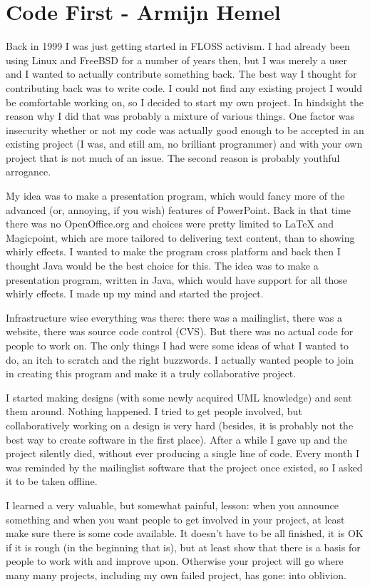 \chapter{Code First - Armijn Hemel}
Back in 1999 I was just getting started in FLOSS activism. I had already been using Linux and FreeBSD for a number of years then, but I was merely a user and I wanted to actually contribute something back. The best way I thought for contributing back was to write code. I could not find any existing project I would be comfortable working on, so I decided to start my own project. In hindsight the reason why I did that was probably a mixture of various things. One factor was insecurity whether or not my code was actually good enough to be accepted in an existing project (I was, and still am, no brilliant programmer) and with your own project that is not much of an issue. The second reason is probably youthful arrogance.

My idea was to make a presentation program, which would fancy more of the advanced (or, annoying, if you wish) features of PowerPoint. Back in that time there was no OpenOffice.org and choices were pretty limited to LaTeX and Magicpoint, which are more tailored to delivering text content, than to showing whirly effects. I wanted to make the program cross platform and back then I thought Java would be the best choice for this. The idea was to make a presentation program, written in Java, which would have support for all those whirly effects. I made up my mind and started the project.

Infrastructure wise everything was there: there was a mailinglist, there was a website, there was source code control (CVS). But there was no actual code for people to work on. The only things I had were some ideas of what I wanted to do, an itch to scratch and the right buzzwords. I actually wanted people to join in creating this program and make it a truly collaborative project.

I started making designs (with some newly acquired UML knowledge) and sent them around. Nothing happened. I tried to get people involved, but collaboratively working on a design is very hard (besides, it is probably not the best way to create software in the first place). After a while I gave up and the project silently died, without ever producing a single line of code. Every month I was reminded by the mailinglist software that the project once existed, so I asked it to be taken offline.

I learned a very valuable, but somewhat painful, lesson: when you announce something and when you want people to get involved in your project, at least make sure there is some code available. It doesn't have to be all finished, it is OK if it is rough (in the beginning that is), but at least show that there is a basis for people to work with and improve upon. Otherwise your project will go where many many projects, including my own failed project, has gone: into oblivion.

